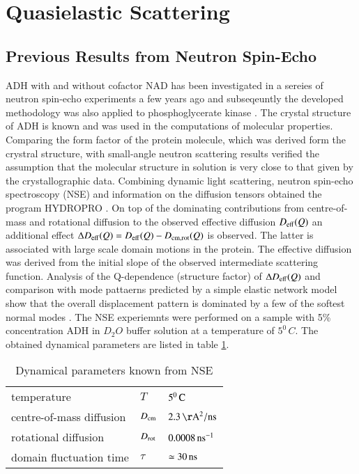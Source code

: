 \documentclass{jpsj-suppl}
\begin{document}
\section{Quasielastic Scattering}

\subsection{Previous Results from Neutron Spin-Echo}
ADH with and without cofactor NAD has been investigated in a sereies of
neutron spin-echo experiments a few years ago \cite{biehl08rb,monkenbusch10rb}
and subseqeuntly the developed methodology was also applied to phosphoglycerate 
kinase \cite{inoue10rb,biehl11rba}. 
The crystal structure of ADH is known and was used in the
computations of molecular properties.
Comparing the form factor of the protein molecule, which was derived form the
crystral structure, with small-angle neutron scattering results verified the
assumption that the molecular structure in solution is very close to that given
by the crystallographic data. Combining dynamic light scattering, 
neutron spin-echo spectroscopy (NSE) and information on the diffusion tensors
obtained the program HYDROPRO \cite{de00h}. On top of the dominating contributions
from centre-of-mass and rotational diffusion to the observed effective diffusion
$D_{\rm eff}(Q)$ an additional effect $\Delta D_{\rm eff}(Q) = D_{\rm eff}(Q)-D_{\rm cm,rot}(Q)$ 
is observed. The latter is associated with large scale domain motions in the protein.
The effective diffusion was derived from the initial slope of the observed intermediate
scattering function.
Analysis of the Q-dependence (structure factor) of $\Delta D_{\rm eff}(Q)$ and comparison 
with mode pattaerns predicted by a simple elastic network model show that the overall
displacement pattern is dominated by a few of the softest normal modes \cite{biehl08rb}.
The NSE experiemnts were performed on a sample with 5\% concentration ADH in $D_2O$ buffer
solution at a temperature of $5^0\,C$. The obtained dynamical parameters are listed in 
table \ref{tab:2}.
%
\begin{table}[tbh]
\caption{Dynamical parameters known from NSE}
\label{tab:2}
\begin{tabular}{lll}
\hline
temperature                  & $T$           & $5^0\,{\rm C}$            \\
centre-of-mass diffusion     & $D_{\rm cm}$  & $2.3\,{\rm \AA^2/ns}$      \\
rotational diffusion         & $D_{\rm rot}$ & $0.0008 \,{\rm ns^{-1}}$  \\
domain fluctuation time      & $\tau$        & $\simeq 30\,{\rm ns}$     \\
\hline
\end{tabular}
\end{table}
\end{document}
